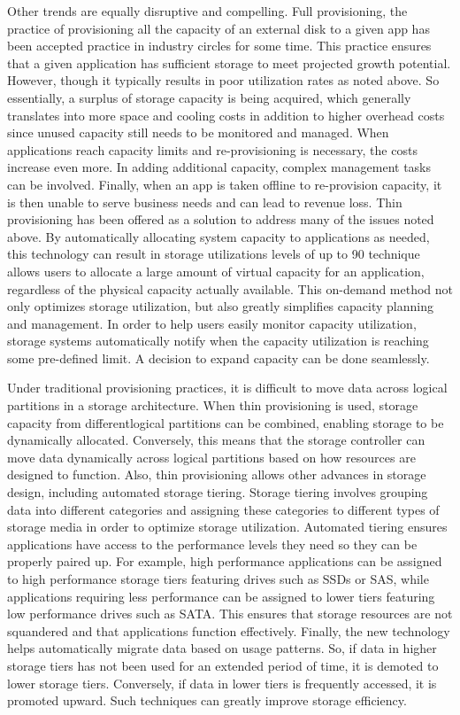 \documentclass[11pt]{article}
\begin{document}
Other trends are equally disruptive and compelling. Full provisioning, the practice of 
provisioning all the capacity of an external disk to a given app has been accepted practice 
in industry circles for some time. This practice ensures that a given application has 
sufficient storage to meet projected growth potential. However, though it typically 
results in poor utilization rates as noted above. So essentially, a surplus of storage 
capacity is being acquired, which generally translates into more space and cooling costs 
in addition to higher overhead costs since unused capacity still needs to be monitored 
and managed. When applications reach capacity limits and re-provisioning is necessary, 
the costs increase even more. In adding additional capacity, complex management tasks 
can be involved. Finally, when an app is taken offline to re-provision capacity, it is 
then unable to serve business needs and can lead to revenue loss. Thin provisioning has 
been offered as a solution to address many of the issues noted above. By automatically 
allocating system capacity to applications as needed, this technology can result in storage 
utilizations levels of up to 90%
technique allows users to allocate a large amount of virtual capacity for an application, 
regardless of the physical capacity actually available. This on-demand method not only 
optimizes storage utilization, but also greatly simplifies capacity planning and management. 
In order to help users easily monitor capacity utilization, storage systems automatically 
notify when the capacity utilization is reaching some pre-defined limit. A decision to 
expand capacity can be done seamlessly. 

Under traditional provisioning practices, it is difficult to move data across logical 
partitions in a storage architecture. When thin provisioning is used, storage capacity 
from differentlogical partitions can be combined, enabling storage to be dynamically 
allocated. Conversely, this means that the storage controller can move data dynamically 
across logical partitions based on how resources are designed to function. Also, thin 
provisioning allows other advances in storage design, including automated storage tiering. 
Storage tiering involves grouping data into different categories and assigning these 
categories to different types of storage media in order to optimize storage utilization. 
Automated tiering ensures applications have access to the performance levels they need so 
they can be properly paired up. For example, high performance applications can be assigned 
to high performance storage tiers featuring drives such as SSDs or SAS, while applications 
requiring less performance can be assigned to lower tiers featuring low performance drives 
such as SATA. This ensures that storage resources are not squandered and that applications 
function effectively. Finally, the new technology helps automatically migrate data based on 
usage patterns. So, if data in higher storage tiers has not been used for an extended period 
of time, it is demoted to lower storage tiers. Conversely, if data in lower tiers is 
frequently accessed, it is promoted upward. Such techniques can greatly improve storage 
efficiency.
\end{document}
